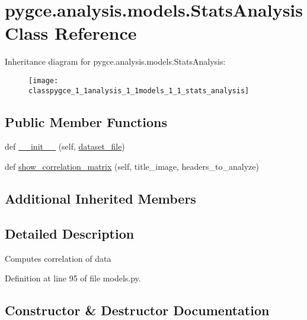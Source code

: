 \hypertarget{classpygce_1_1analysis_1_1models_1_1_stats_analysis}{}\section{pygce.\+analysis.\+models.\+Stats\+Analysis Class Reference}
\label{classpygce_1_1analysis_1_1models_1_1_stats_analysis}
Inheritance diagram for pygce.\+analysis.\+models.\+Stats\+Analysis\+:\begin{figure}[H]
\begin{center}
\leavevmode
\texttt{[image: classpygce\_1\_1analysis\_1\_1models\_1\_1\_stats\_analysis]}
\end{center}
\end{figure}
\subsection*{Public Member Functions}
\begin{DoxyCompactItemize}
\item 
def \hyperlink{classpygce_1_1analysis_1_1models_1_1_stats_analysis_a161706ff9c5a5410356e28a240ea5e29}{\+\_\+\+\_\+init\+\_\+\+\_\+} (self, \hyperlink{classpygce_1_1analysis_1_1models_1_1_garmin_data_filter_a7bb7be05577c2d31546e27823a5d11c5}{dataset\+\_\+file})
\item 
def \hyperlink{classpygce_1_1analysis_1_1models_1_1_stats_analysis_a2dd9052d1133c137c3049c6a425f8722}{show\+\_\+correlation\+\_\+matrix} (self, title\+\_\+image, headers\+\_\+to\+\_\+analyze)
\end{DoxyCompactItemize}
\subsection*{Additional Inherited Members}


\subsection{Detailed Description}
\begin{DoxyVerb}Computes correlation of data\end{DoxyVerb}
 

Definition at line 95 of file models.\+py.



\subsection{Constructor \& Destructor Documentation}
